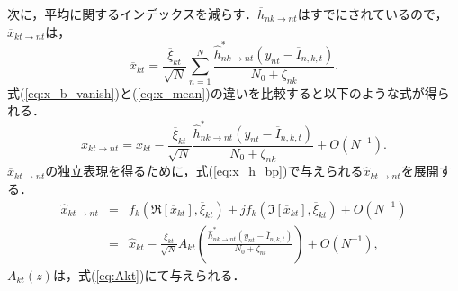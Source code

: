 次に，平均に関するインデックスを減らす．$\overline{h}_{nk \to nt}$はすでにされているので，$\overline{x}_{kt \to nt}$は，
\begin{equation}
	\label{eq:x_b_vanish}
	\overline{x}_{kt}=
		\frac{\overline{\xi}_{kt}}{\sqrt{N}}
		\sum_{n=1}^N
			\frac
			{\hat{h}^{*}_{nk\to nt}(y_{nt}-\overline{I}_{n,k,t})}
			{N_{0}+\zeta_{nk}}
			.
\end{equation}
式(\ref{eq:x_b_vanish})と(\ref{eq:x_mean})の違いを比較すると以下のような式が得られる．
\begin{equation}
	\label{eq:before_x_b}
	\overline{x}_{kt\to nt}=
		\overline{x}_{kt}
		-
		\frac{\overline{\xi}_{kt}}{\sqrt{N}}
		\frac
		{\hat{h}^{*}_{nk\to nt}(y_{nt}-\overline{I}_{n,k,t})}
		{N_{0}+\zeta_{nk}}
		+O(N^{-1})
		.
\end{equation}
$\overline{x}_{kt \to nt}$の独立表現を得るために，式(\ref{eq:x_h_bp})で与えられる$\hat{x}_{kt \to nt}$を展開する．
\begin{eqnarray}
	\hat{x}_{kt \to nt}	
	&=&
		f_{k}(\Re[\overline{x}_{kt}],\overline{\xi}_{kt})
		+jf_{k}(\Im[\overline{x}_{kt}],\overline{\xi}_{kt})
		+O(N^{-1})\\
	\label{eq:combine_x}
	&=&	\hat{x}_{kt} 
		- \frac{\overline{\xi}_{kt}}{\sqrt{N}}A_{kt}
		\left(
			\frac{\hat{h}^{*}_{nk \to nt}
			\left(
				y_{nt} -  \overline{I}_{n,k,t}
			\right)}
			{N_0 + \zeta_{nt}}
		\right)+O(N^{-1}),
\end{eqnarray}
$A_{kt}(z)$は，式(\ref{eq:Akt})にて与えられる．

